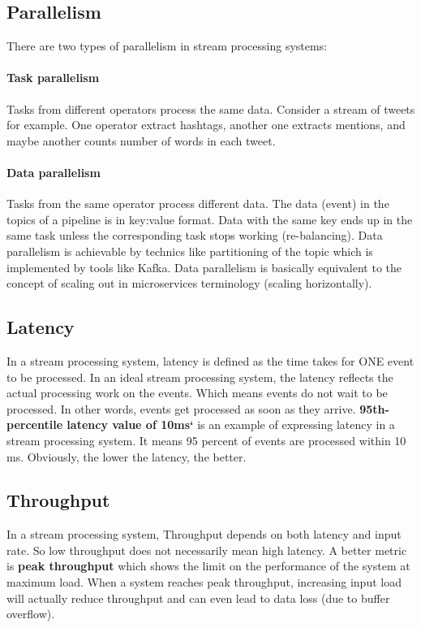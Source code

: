 \documentclass[a4]{report}
\begin{document}
    \subsection{Parallelism}
    There are two types of parallelism in stream processing systems:

    \paragraph{Task parallelism}
    Tasks from different operators process the same data.
    Consider a stream of tweets for example.
    One operator extract hashtags, another one extracts mentions, and maybe another counts number of words in each
    tweet.

    \paragraph{Data parallelism}
    Tasks from the same operator process different data.
    The data (event) in the topics of a pipeline is in key:value format.
    Data with the same key ends up in the same task unless the corresponding task stops working (re-balancing).
    Data parallelism is achievable by technics like partitioning of the topic which is implemented by tools like Kafka.
    Data parallelism is basically equivalent to the concept of scaling out in microservices terminology (scaling horizontally).

    \subsection{Latency}
    In a stream processing system, latency is defined as the time takes for ONE event to be processed.
    In an ideal stream processing system, the latency reflects the actual processing work on the events.
    Which means events do not wait to be processed.
    In other words, events get processed as soon as they arrive.
    \textbf{95th-percentile latency value of 10ms`} is an example of expressing latency in a stream processing system.
    It means 95 percent of events are processed within 10 ms.
    Obviously, the lower the latency, the better.

    \subsection{Throughput}
    In a stream processing system, Throughput depends on both latency and input rate.
    So low throughput does not necessarily mean high latency.
    A better metric is \textbf{peak throughput} which shows the limit on the performance of the system at maximum load.
    When a system reaches peak throughput, increasing input load will actually reduce throughput and can even lead to
    data loss (due to buffer overflow).
\end{document}
